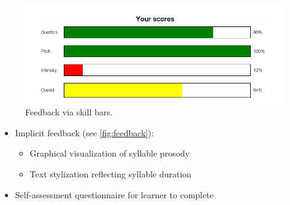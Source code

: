 \documentclass[a0,portrait]{a0poster}
\newcommand{\headingcolor}{\color{BannerSixColor}}
\def\Highlight#1{{\sffamily \headingcolor #1}}
\begin{document}
\begin{textblock}{7}
\begin{textblock}{7}
  \begin{figure}
  	\centering
	\includegraphics[width=.7\textwidth]{../../../img/screenshots/skillBars-balanced-pct}
	\caption{Feedback via skill bars.}
  \end{figure}
  
  \begin{itemize}
  \item{\Highlight{Implicit feedback} (see \cref{fig:feedback}):
	  	\begin{itemize}
	  	\item{Graphical visualization of syllable prosody}
	  	\item{Text stylization reflecting syllable duration}
	  	\end{itemize}
	}
  \item{\Highlight{Self-assessment} questionnaire for learner to complete %
  }
  \end{itemize}




\end{textblock}
  
  \end{textblock}
  
  
  
\end{document}
